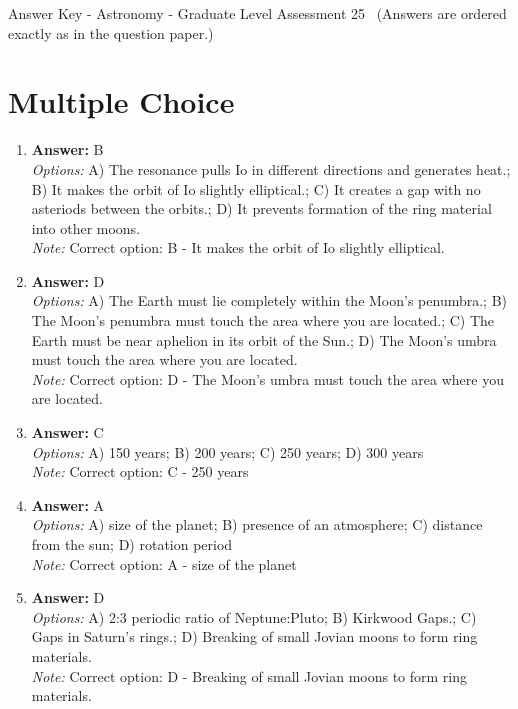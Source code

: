 \documentclass[12pt]{article}
\begin{document}
\begin{center}
Answer Key - Astronomy - Graduate Level Assessment 25 \
\small (Answers are ordered exactly as in the question paper.)
\end{center}

\section*{Multiple Choice}
\begin{enumerate}[label=\arabic*.]
\item \textbf{Answer:} B
\\ \textit{Options:} A) The resonance pulls Io in different directions and generates heat.; B) It makes the orbit of Io slightly elliptical.; C) It creates a gap with no asteriods between the orbits.; D) It prevents formation of the ring material into other moons.
\\ \textit{Note:} Correct option: B - It makes the orbit of Io slightly elliptical.
\item \textbf{Answer:} D
\\ \textit{Options:} A) The Earth must lie completely within the Moon's penumbra.; B) The Moon's penumbra must touch the area where you are located.; C) The Earth must be near aphelion in its orbit of the Sun.; D) The Moon's umbra must touch the area where you are located.
\\ \textit{Note:} Correct option: D - The Moon's umbra must touch the area where you are located.
\item \textbf{Answer:} C
\\ \textit{Options:} A) 150 years; B) 200 years; C) 250 years; D) 300 years
\\ \textit{Note:} Correct option: C - 250 years
\item \textbf{Answer:} A
\\ \textit{Options:} A) size of the planet; B) presence of an atmosphere; C) distance from the sun; D) rotation period
\\ \textit{Note:} Correct option: A - size of the planet
\item \textbf{Answer:} D
\\ \textit{Options:} A) 2:3 periodic ratio of Neptune:Pluto; B) Kirkwood Gaps.; C) Gaps in Saturn's rings.; D) Breaking of small Jovian moons to form ring materials.
\\ \textit{Note:} Correct option: D - Breaking of small Jovian moons to form ring materials.
\end{enumerate}
\end{document}
